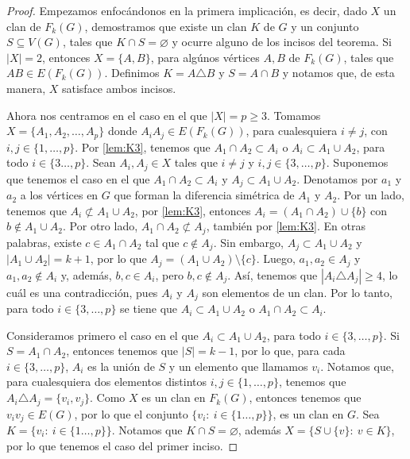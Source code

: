 \begin{proof}
    Empezamos enfoc\'andonos en la primera implicaci\'on, es decir, dado $X$ un
    clan de $F_k(G)$, demostramos que existe un clan $K$ de $G$ y un conjunto $S
    \subseteq V(G)$, tales que $K \cap S = \varnothing$ y ocurre alguno de los
    incisos del teorema. Si $|X|=2$, entonces $X= \{A, B\}$, para alg\'unos
    v\'ertices $A, B$ de $F_k(G)$, tales que $AB \in E(F_k(G))$. Definimos $K =
    A \triangle B$ y $S=A \cap B$ y notamos que, de esta manera, $X$ satisface
    ambos incisos.

    Ahora nos centramos en el caso en el que $|X|= p \geq 3$. Tomamos $X=\{A_1,
    A_2, \dots, A_p\}$ donde $A_i{A_j} \in E(F_k(G))$, para cualesquiera $i\neq
    j$, con $i,j \in \{1, \dots, p\}$. Por \cref{lem:K3}, tenemos que $A_1\cap
    A_2 \subset A_i$ o $A_i \subset A_1 \cup A_2$, para todo $i \in \{3 \dots,p
    \}$. Sean $A_i, A_j \in X$ tales que $i \neq j$ y $i, j \in \{3, \dots,
    p\}$. Suponemos que tenemos el caso en el que $A_1\cap A_2 \subset A_i$ y
    $A_j \subset A_1 \cup A_2$. Denotamos por $a_1$ y $a_2$ a los v\'ertices en
    $G$ que forman la diferencia sim\'etrica de $A_1$ y $A_2$. Por un lado,
    tenemos que $A_i \not\subset A_1\cup A_2$, por \cref{lem:K3}, entonces $A_i
    = (A_1\cap A_2) \cup \{b\}$ con $b \notin A_1\cup A_2$. Por otro lado, $A_1
    \cap A_2 \not\subset A_j$, tambi\'en por \cref{lem:K3}. En otras palabras,
    existe $c \in A_1 \cap A_2$ tal que $c \notin A_j$. Sin embargo, $A_j
    \subset A_1 \cup A_2$ y $|A_1 \cup A_2| =k+1$, por lo que $A_j = (A_1 \cup
    A_2)\setminus \{c\}$. Luego, $a_1, a_2 \in A_j$ y $a_1, a_2 \notin A_i$ y,
    adem\'as, $b, c \in A_i$, pero $b, c \notin A_j$. As\'i, tenemos que $|A_i
    \triangle A_j| \geq 4$, lo cu\'al es una contradicci\'on, pues $A_i$ y $A_j$
    son elementos de un clan. Por lo tanto, para todo $i\in \{3, \dots, p\}$ se
    tiene que $A_i \subset A_1\cup A_2$ o $A_1 \cap A_2 \subset A_i$.

    Consideramos primero el caso en el que $A_i \subset A_1\cup A_2$, para todo
    $i\in \{3, \dots, p\}$. Si $S= A_1 \cap A_2$, entonces tenemos que $|S|
    =k-1$, por lo que, para cada $i \in \{3, \dots, p\}$, $A_i$ es la uni\'on de
    $S$ y un elemento que llamamos $v_i$. Notamos que, para cualesquiera dos
    elementos distintos $i, j \in \{1, \dots, p\}$, tenemos que $A_i \triangle
    A_j = \{v_i, v_j\}$. Como $X$ es un clan en $F_k(G)$, entonces tenemos que
    $v_i{v_j} \in E(G)$, por lo que el conjunto $\{v_i\colon\ i \in \{1 \dots,
    p\}\}$, es un clan en $G$.   Sea $K = \{v_i\colon\ i \in \{1 \dots, p\}\}$.
    Notamos que  $K \cap S = \varnothing$, adem\'as $X= \{S \cup \{v\}\colon\ v
    \in K\}$, por lo que tenemos el caso del primer inciso.


\end{proof}
